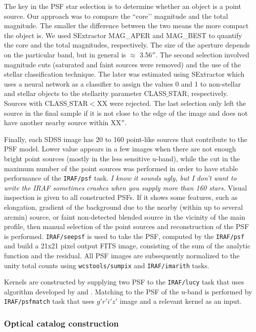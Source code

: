 \documentclass[apj,iop]{emulateapj}
\begin{document}
   The key in the PSF star selection is to determine whether an object is a point source. Our approach was to compare the ``core’’ magnitude and the total magnitude. The smaller the difference between the two means the more compact the object is. We used SExtractor MAG\_APER and MAG\_BEST to quantify the core and the total magnitudes, respectively. The size of the aperture depends on the particular band, but in general is $\approx$ 3.56$''$. The second selection involved magnitude cuts (saturated and faint sources were removed) and the use of the stellar classification technique. The later was estimated using SExtractor which uses a neural network as a classifier to assign the values 0 and 1 to non-stellar and stellar objects to the stellarity parameter CLASS$\_$STAR, respectively. Sources with CLASS$\_$STAR$<$XX were rejected. The last selection only left the source in the final sample if it is not close to the edge of the image and does not have another nearby source within XX$''$. 

Finally, each SDSS image has 20 to 160 point-like sources that contribute to the PSF model. Lower value appears in a few images when there are not enough bright point sources (mostly in the less sensitive u-band), while the cut in the maximum number of the point sources was performed in order to have stable performance of the {\tt IRAF/psf} task. \textit{I know it sounds ugly, but I don't want to write the IRAF sometimes  crashes when you supply more than 160 stars.} Visual inspection is given to all constructed PSFs. If it shows some features, such as elongation, gradient of the background due to the nearby (within up to several arcmin) source, or faint non-detected blended source in the vicinity of the main profile, then manual selection of the point sources and reconstruction of the PSF is performed. {\tt IRAF/seepsf} is used to take the PSF, computed by the {\tt IRAF/psf} and build a 21x21 pixel output FITS image, consisting of the sum of the analytic function and the residual. All PSF images are subsequently normalized to the unity total counts using {\tt wcstools/sumpix} \citep{Mink1998b} and {\tt IRAF/imarith} tasks. 

Kernels are constructed by supplying two PSF to the {\tt IRAF/lucy} task that uses algorithm developed by \citet{Richardson1972} and \citet{Lucy1974}. Matching to the PSF of the u-band is performed by {\tt IRAF/psfmatch} task that uses $g'r'i'z'$ image and a relevant kernel as an input.

\subsubsection{Optical catalog construction}
\end{document}
